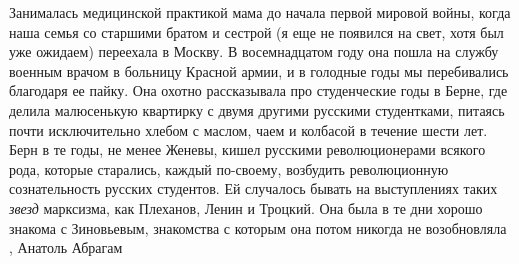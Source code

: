 Занималась медицинской практикой мама до начала первой мировой войны, когда
наша семья со старшими братом и сестрой (я еще не появился на свет, хотя был
уже ожидаем) переехала в Москву. В восемнадцатом году она пошла на службу
военным врачом в больницу Красной армии, и в голодные годы мы перебивались
благодаря ее пайку. Она охотно рассказывала про студенческие годы в Берне, где
делила малюсенькую квартирку с двумя другими русскими студентками, питаясь
почти исключительно хлебом с маслом, чаем и колбасой в течение шести лет. Берн
в те годы, не менее Женевы, кишел русскими революционерами всякого рода,
которые старались, каждый по-своему, возбудить революционную сознательность
русских студентов. Ей случалось бывать на выступлениях таких \emph{звезд} марксизма,
как Плеханов, Ленин и Троцкий. Она была в те дни хорошо знакома с Зиновьевым,
знакомства с которым она потом никогда не возобновляла
, Анатоль Абрагам
